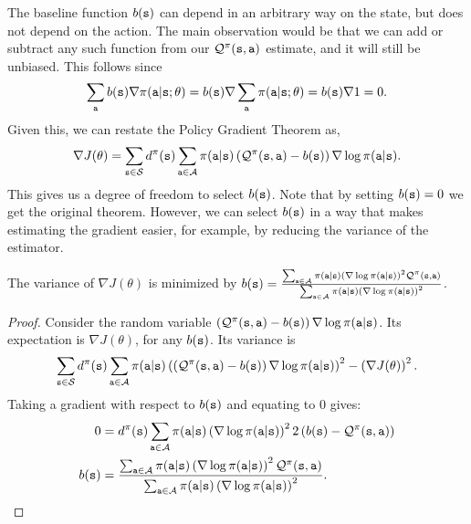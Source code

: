 The baseline function $b({\tt s})$ can depend in an arbitrary way on
the state, but does not depend on the action. The main observation
would be that we can add or subtract any such function from our
$\mathcal{Q}^\pi
({\tt s},{\tt a})$ estimate, and it will still be unbiased. This follows since
\begin{equation}\label{eq:no_bias_trick}
\sum_{\tt a} b({\tt s}) \nabla
\pi({\tt a}|{\tt s};\theta)=b({\tt s})\nabla \sum_{\tt a}
\pi({\tt a}|{\tt s};\theta)=b({\tt s})\nabla 1=0.
\end{equation}
Given this, we can restate the Policy Gradient Theorem as,
\[
\nabla J(\theta) = \sum_{{\tt s} \in \mathcal{S}} d^{\pi}({\tt s}) \sum_{{\tt a}\in
\mathcal{A}} \pi({\tt a}|{\tt s}) \left(\mathcal{Q}^\pi
({\tt s},{\tt a}) - b({\tt s})\right)\nabla \log \pi({\tt a}|{\tt s}).
\]
This gives us a degree of freedom to select $b({\tt s})$. Note that
by setting $b({\tt s})=0$ we get the original theorem. However, we can select $b({\tt s})$ in a way that makes estimating the gradient easier, for example, by reducing the variance of the estimator.
\begin{proposition}
    The variance of $\nabla J(\theta)$ is minimized by $b({\tt s}) = \frac{\sum_{{\tt a}\in\mathcal{A}} \pi({\tt a}|{\tt s}) \left(\nabla \log \pi({\tt a}|{\tt s})\right)^2 \mathcal{Q}^\pi({\tt s},{\tt a})}{\sum_{{\tt a}\in\mathcal{A}} \pi({\tt a}|{\tt s}) \left(\nabla \log \pi({\tt a}|{\tt s})\right)^2}$.
\end{proposition}
\begin{proof}
Consider the random variable $\left(\mathcal{Q}^\pi({\tt s},{\tt a}) - b({\tt s})\right)\nabla \log \pi({\tt a}|{\tt s})$. Its expectation is $\nabla J(\theta)$, for any $b({\tt s})$. Its variance is $$
\sum_{{\tt s} \in \mathcal{S}} d^{\pi}({\tt s}) \sum_{{\tt a}\in\mathcal{A}} \pi({\tt a}|{\tt s}) \left(\left(\mathcal{Q}^\pi({\tt s},{\tt a}) - b({\tt s})\right)\nabla \log \pi({\tt a}|{\tt s})\right)^2 - \left(\nabla J(\theta)\right)^2.
$$
Taking a gradient with respect to $b({\tt s})$ and equating to $0$ gives:
\begin{equation*}    
\begin{split}
    0 &= d^{\pi}({\tt s}) \sum_{{\tt a}\in\mathcal{A}} \pi({\tt a}|{\tt s}) \left(\nabla \log \pi({\tt a}|{\tt s})\right)^2 2 \left(b({\tt s}) - \mathcal{Q}^\pi({\tt s},{\tt a})\right) \\
    b({\tt s}) &= \frac{\sum_{{\tt a}\in\mathcal{A}} \pi({\tt a}|{\tt s}) \left(\nabla \log \pi({\tt a}|{\tt s})\right)^2 \mathcal{Q}^\pi({\tt s},{\tt a})}{\sum_{{\tt a}\in\mathcal{A}} \pi({\tt a}|{\tt s}) \left(\nabla \log \pi({\tt a}|{\tt s})\right)^2}.
\end{split}
\end{equation*}
\end{proof}

